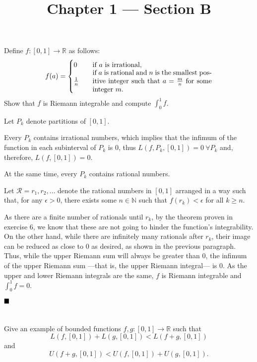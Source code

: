 \documentclass[11pt, a4paper, tikz]{article}
\newcommand{\centsection}[1]{
	\section*{\centering{#1}}
}
\renewcommand{\qed}{\hfill\blacksquare}
\newcommand{\Int}[2]{\displaystyle \int_{#1}^{#2}}
\newcommand{\naturals}{
	\ensuremath{\mathbb{N}}
}
\newcommand{\reals}{
	\ensuremath{\mathbb{R}}
}
\begin{document}
	\title{\textbf{Chapter 1 — Section B}}
	\maketitle
	\centsection{Exercise 1}
	
	\begin{formulationBox}
		Define $f:[0,1]\rightarrow\reals$ as follows:
		\[
			f(a) =
			\begin{cases}
				0 &\quad \textrm{if $a$ is irrational,}\\
				\frac{1}{n} &\quad \parbox{.5\linewidth}{if $a$ is rational and $n$ is the smallest positive integer such that $a=\frac{m}{n}$ for some integer $m$.}
			\end{cases}
		\]
		Show that $f$ is Riemann integrable and compute $\Int{0}{1}f$.
	\end{formulationBox}
	
	Let $P_k$ denote partitions of $[0,1]$.
	
	Every $P_k$ contains irrational numbers, which implies that the infimum of the function in each subinterval of $P_k$ is 0, thus $L(f, P_k, [0,1]) = 0\ \forall P_k$ and, therefore, $L(f, [0,1]) = 0$.
	
	At the same time, every $P_k$ contains rational numbers.
	
	Let $\mathcal{R} = r_1, r_2, \dots$ denote the rational numbers in $[0, 1]$ arranged in a way such that, for any $\epsilon>0$, there exists some $n\in\naturals$ such that $f(r_k)<\epsilon$ for all $k\geq n$.
	
	As there are a finite number of rationals until $r_k$, by the theorem proven in exercise 6, we know that these are not going to hinder the function's integrability. On the other hand, while there are infinitely many rationals after $r_k$, their image can be reduced as close to 0 as desired, as shown in the previous paragraph. Thus, while the upper Riemann sum will always be greater than 0, the infimum of the upper Riemann sum —that is, the upper Riemann integral— is 0. As the upper and lower Riemann integrals are the same, $f$ is Riemann integrable and $\Int{0}{1}f = 0$.
	
	$\qed$
	
	\centsection{Exercise 4}
	
	\begin{formulationBox}
		Give an example of bounded functions $f, g:[0,1]\rightarrow\reals$ such that \[L(f, [0,1]) + L(g, [0,1]) < L(f+g,[0,1])\] and \[U(f+g,[0,1]) < U(f, [0,1]) + U(g, [0,1]).\]
	\end{formulationBox}
	
\end{document}
